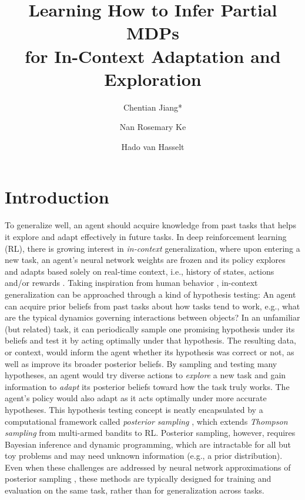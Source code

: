 \documentclass[sigconf]{aamas}
\title[Learning How to Infer Partial MDPs]{Learning How to Infer Partial MDPs \\ for In-Context Adaptation and Exploration}
\author{Chentian Jiang*}
\affiliation{
  \institution{Informatics, University of Edinburgh}
  \city{Edinburgh}
  \country{United Kingdom}}
\author{Nan Rosemary Ke}
\affiliation{
  \institution{DeepMind}
  \city{London}
  \country{United Kingdom}}
\author{Hado van Hasselt}
\affiliation{
  \institution{DeepMind}
  \city{London}
  \country{United Kingdom}}
\begin{document}
\pagestyle{fancy}
\fancyhead{}
\maketitle
\renewcommand*{\thefootnote}{\fnsymbol{footnote}}
\renewcommand*{\thefootnote}{\arabic{footnote}}
\renewcommand*{\thefootnote}{}
\renewcommand*{\thefootnote}{\arabic{footnote}}
\section{Introduction}\label{sec:intro}
To generalize well, an agent should acquire knowledge from past tasks that helps it explore and adapt effectively in future tasks. In deep reinforcement learning (RL), there is growing interest in \textit{in-context} generalization, where upon entering a new task, an agent's neural network weights are frozen and its policy explores and adapts based solely on real-time context, i.e., history of states, actions and/or rewards \citep[e.g.,][]{wangLearningReinforcementLearn2016,duanRLFastReinforcement2016,laskinIncontextReinforcementLearning2022}.
Taking inspiration from human behavior \citep[e.g.,][]{speekenbrinkUncertaintyExplorationRestless2015,schulzLearningDecisionsContextual2015}, in-context generalization can be approached through a kind of hypothesis testing: An agent can acquire prior beliefs from past tasks about how tasks tend to work, e.g., what are the typical dynamics governing interactions between objects? In an unfamiliar (but related) task, it can periodically sample one promising hypothesis under its beliefs and test it by acting optimally under that hypothesis. The resulting data, or context, would inform the agent whether its hypothesis was correct or not, as well as improve its broader posterior beliefs. By sampling and testing many hypotheses, an agent would try diverse actions to \textit{explore} a new task and gain information to \textit{adapt} its posterior beliefs toward how the task truly works. The agent's policy would also adapt as it acts optimally under more accurate hypotheses.
This hypothesis testing concept is neatly encapsulated by a computational framework called \textit{posterior sampling} \cite{strensBayesianFrameworkReinforcement2000,osbandMoreEfficientReinforcement2013}, which extends \textit{Thompson sampling} \cite{thompsonLikelihoodThatOne1933} from multi-armed bandits to RL. Posterior sampling, however, requires Bayesian inference and dynamic programming, which are intractable for all but toy problems and may need unknown information (e.g., a prior distribution). Even when these challenges are addressed by neural network approximations of posterior sampling \citep[e.g.,][]{osbandDeepExplorationRandomized2019,osbandDeepExplorationBootstrapped2016,azizzadenesheliEfficientExplorationBayesian2019,liptonBBQNetworksEfficientExploration2018,fortunatoNoisyNetworksExploration2018}, these methods are typically designed for training and evaluation on the same task, rather than for generalization across tasks.
\end{document}
